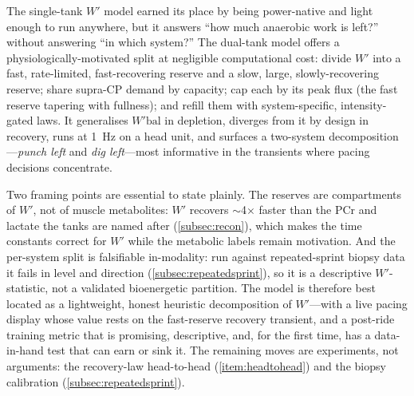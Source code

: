 \documentclass[11pt,a4paper]{article}
\newcommand{\Wp}{\ensuremath{W'}}
\newcommand{\Wbal}{\ensuremath{W'\!\text{bal}}}
\newcommand{\CP}{\ensuremath{\mathrm{CP}}}
\begin{document}
The single-tank \Wp{} model earned its place by being power-native and light enough to run anywhere, but it
answers ``how much anaerobic work is left?'' without answering ``in which system?'' The dual-tank model
offers a physiologically-motivated split at negligible computational cost: divide \Wp{} into a fast,
rate-limited, fast-recovering reserve and a slow, large, slowly-recovering reserve; share supra-\CP{}
demand by capacity; cap each by its peak flux (the fast reserve tapering with fullness); and refill them
with system-specific, intensity-gated laws. It generalises \Wbal{} in depletion, diverges from it by design
in recovery, runs at 1~Hz on a head unit, and surfaces a two-system decomposition---\emph{punch left} and
\emph{dig left}---most informative in the transients where pacing decisions concentrate.

Two framing points are essential to state plainly. The reserves are compartments of \Wp, not of muscle
metabolites: \Wp{} recovers $\sim$4$\times$ faster than the PCr and lactate the tanks are named after
(\cref{subsec:recon}), which makes the time constants correct for \Wp{} while the metabolic labels remain
motivation. And the per-system split is falsifiable in-modality: run against repeated-sprint biopsy data it
fails in level and direction (\cref{subsec:repeatedsprint}), so it is a descriptive \Wp-statistic, not a
validated bioenergetic partition. The model is therefore best located as a lightweight, honest heuristic
decomposition of \Wp---with a live pacing display whose value rests on the fast-reserve recovery transient,
and a post-ride training metric that is promising, descriptive, and, for the first time, has a data-in-hand
test that can earn or sink it. The remaining moves are experiments, not arguments: the recovery-law
head-to-head (\cref{item:headtohead}) and the biopsy calibration (\cref{subsec:repeatedsprint}).
\end{document}
